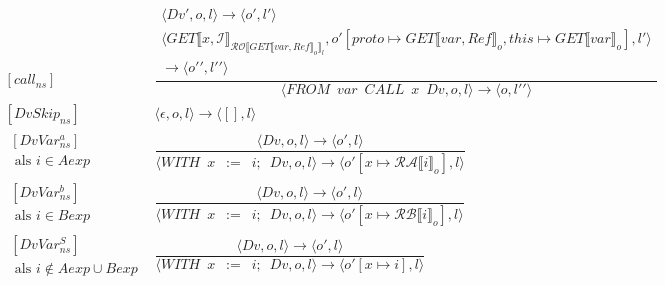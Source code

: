 \documentclass[12pt]{article}
\newcommand{\RA}{\mathcal{RA}}
\newcommand{\RB}{\mathcal{RB}}
\newcommand{\RO}{\mathcal{RO}}
\begin{document}
\[
\begin{matrix}
[call_{ns}] &
\dfrac
{
	\begin{matrix}
	\langle Dv', o, l \rangle \rightarrow \langle o\prime, l\prime \rangle\\
	\langle GET \llbracket x, \mathcal{I} \rrbracket_{\RO \llbracket GET\llbracket var, Ref \rrbracket_o \rrbracket_l}, o\prime [proto \mapsto GET\llbracket var, Ref \rrbracket_o, this \mapsto GET\llbracket var \rrbracket_o], l\prime \rangle\\
	\rightarrow
	\langle o\prime\prime, l\prime\prime \rangle
	\end{matrix}	
}
{
	\langle FROM \enspace var \enspace CALL \enspace x \enspace Dv,o,l \rangle
	\rightarrow
	\langle o, l\prime\prime \rangle
} \\[60pt]
[DvSkip_{ns}] &
\langle \epsilon ,o,l \rangle \rightarrow \langle [],l \rangle \\[60pt]
\begin{matrix}
[DvVar_{ns}^{a}]\\
\mbox{ als } i \in Aexp 
\end{matrix}
 &
\dfrac
{	\langle Dv,o,l \rangle \rightarrow \langle o\prime, l \rangle }
{
	\langle WITH \enspace x \enspace := \enspace i; \enspace Dv, o, l \rangle
	\rightarrow
	\langle o\prime[x \mapsto \RA \llbracket i \rrbracket_o], l \rangle
}\\[60pt]
\begin{matrix}
[DvVar_{ns}^{b}]\\
\mbox{ als } i \in Bexp
\end{matrix}
&
\dfrac
{	\langle Dv,o,l \rangle \rightarrow \langle o\prime, l \rangle }
{
	\langle WITH \enspace x \enspace := \enspace i; \enspace Dv, o, l \rangle
	\rightarrow
	\langle o\prime[x \mapsto \RB \llbracket i \rrbracket_o], l \rangle
}\\[60pt]
\begin{matrix}
[DvVar_{ns}^{S}]\\
\mbox{ als } i \notin Aexp \cup Bexp
\end{matrix}
&
\dfrac
{	\langle Dv,o,l \rangle \rightarrow \langle o\prime, l \rangle }
{
	\langle WITH \enspace x \enspace := \enspace i; \enspace Dv, o, l \rangle
	\rightarrow
	\langle o\prime[x \mapsto i ], l \rangle
}\\

\end{matrix}
\]

\end{document}
